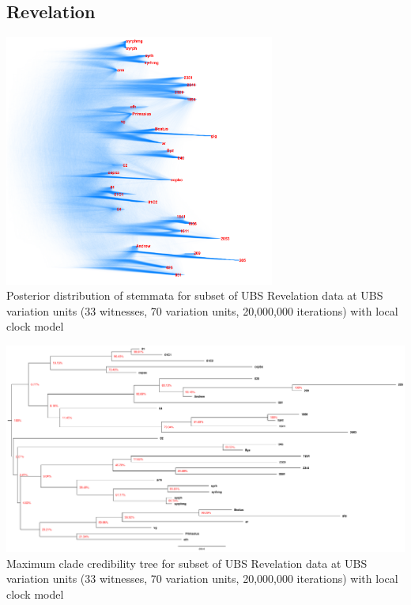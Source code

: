 \documentclass[10pt]{beamer}
\begin{document}
	\subsection{Revelation}
	\begin{frame}
		\begin{center}
			\includegraphics[width=0.6667\textwidth]{../img/ubs_revelation_local_densitree.pdf}\\
			Posterior distribution of stemmata for subset of UBS Revelation data at UBS variation units (33 witnesses, 70 variation units, 20,000,000 iterations) with local clock model\\
		\end{center}
	\end{frame}
	\begin{frame}
		\begin{center}
			\includegraphics[width=\textwidth]{../img/ubs_revelation_local_max_clade_credibility_tree.pdf}\\
			Maximum clade credibility tree for subset of UBS Revelation data at UBS variation units (33 witnesses, 70 variation units, 20,000,000 iterations) with local clock model\\
		\end{center}
	\end{frame}
\end{document}

